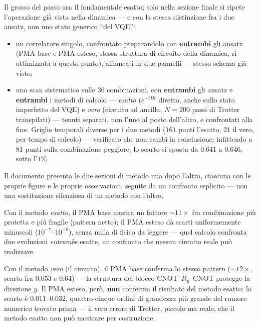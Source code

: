\documentclass[11pt,a4paper]{article}
\begin{document}
Il grosso del passo usa il fondamentale esatto; solo nella sezione finale si
ripete l'operazione già vista nella dinamica --- e con la stessa
distinzione fra i due ansatz, non uno stato generico ``del VQE'':

\begin{itemize}[leftmargin=1.8em,itemsep=3pt]
\item un correlatore singolo, confrontato preparandolo con \textbf{entrambi}
gli ansatz (PMA base e PMA esteso, stessa struttura di circuito della
dinamica, ri-ottimizzata a questo punto), affiancati in due pannelli
--- stesso schema già visto;
\item uno scan sistematico sulle $36$ combinazioni, con \textbf{entrambi}
gli ansatz e \textbf{entrambi} i metodi di calcolo --- \emph{esatto}
($e^{-iHt}$ diretto, anche sullo stato imperfetto del VQE) e \emph{vero}
(circuito ad ancilla, $N=200$ passi di Trotter transpilati) --- tenuti
separati, non l'uno al posto dell'altro, e confrontati alla fine. Griglie
temporali diverse per i due metodi ($161$ punti l'esatto, $21$ il vero,
per tempo di calcolo) --- verificato che non cambi la conclusione:
infittendo a $81$ punti sulla combinazione peggiore, lo scarto si sposta
da $0.641$ a $0.646$, sotto l'$1\%$.
\end{itemize}

Il documento presenta le due sezioni di metodo una dopo l'altra, ciascuna
con le proprie figure e le proprie osservazioni, seguite da un confronto
esplicito --- non una sostituzione silenziosa di un metodo con l'altro.

Con il metodo \emph{esatto}, il PMA base mostra un fattore $\sim11\times$
fra combinazione più protetta e più fragile (pattern netto); il PMA
esteso dà scarti uniformemente minuscoli ($10^{-7}$--$10^{-8}$), senza
nulla di fisico da leggere --- quel calcolo confronta due evoluzioni
\emph{entrambe} esatte, un confronto che nessun circuito reale può
realizzare.

Con il metodo \emph{vero} (il circuito), il PMA base conferma lo stesso
pattern ($\sim12\times$, scarto fra $0.053$ e $0.64$) --- la struttura del
blocco CNOT--$R_y$--CNOT protegge la direzione $y$. Il PMA esteso, però,
\textbf{non} conferma il risultato del metodo esatto: lo scarto è
$0.011$--$0.032$, quattro-cinque ordini di grandezza più grande del
rumore numerico trovato prima --- il vero errore di Trotter, piccolo ma
reale, che il metodo esatto non può mostrare per costruzione.

\end{document}

